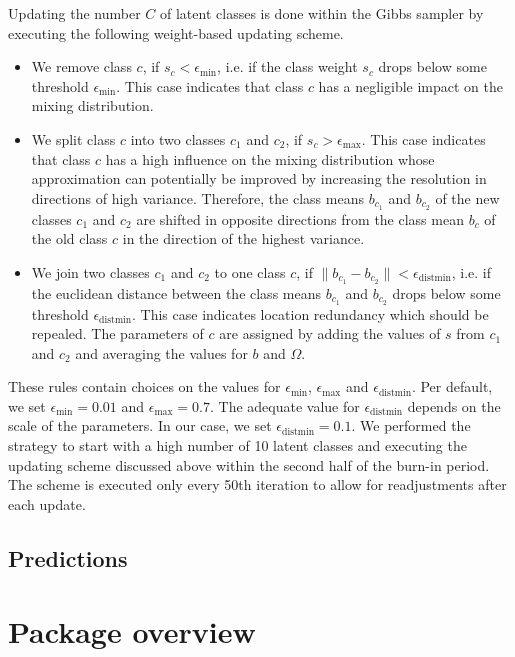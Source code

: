\documentclass[article]{jss}
\begin{document}
Updating the number $C$ of latent classes is done within the Gibbs sampler by executing the following weight-based updating scheme.
\begin{itemize}
	\item We remove class $c$, if $s_c<\epsilon_{\text{min}}$, i.e. if the class weight $s_c$ drops below some threshold $\epsilon_{\text{min}}$. This case indicates that class $c$ has a negligible impact on the mixing distribution.
	\item We split class $c$ into two classes $c_1$ and $c_2$, if $s_c>\epsilon_\text{max}$. This case indicates that class $c$ has a high influence on the mixing distribution whose approximation can potentially be improved by increasing the resolution in directions of high variance. Therefore, the class means $b_{c_1}$ and $b_{c_2}$ of the new classes $c_1$ and $c_2$ are shifted in opposite directions from the class mean $b_c$ of the old class $c$ in the direction of the highest variance.
	\item We join two classes $c_1$ and $c_2$ to one class $c$, if $\lVert b_{c_1} - b_{c_2} \rVert<\epsilon_{\text{distmin}}$, i.e. if the euclidean distance between the class means $b_{c_1}$ and $b_{c_2}$  drops below some threshold $\epsilon_{\text{distmin}}$. This case indicates location redundancy which should be repealed. The parameters of $c$ are assigned by adding the values of $s$ from $c_1$ and $c_2$ and averaging the values for $b$ and $\Omega$.
\end{itemize}
These rules contain choices on the values for $\epsilon_{\text{min}}$, $\epsilon_{\text{max}}$ and $\epsilon_{\text{distmin}}$. Per default, we set $\epsilon_{\text{min}}=0.01$ and $\epsilon_{\text{max}}=0.7$. The adequate value for $\epsilon_{\text{distmin}}$ depends on the scale of the parameters. In our case, we set $\epsilon_{\text{distmin}}=0.1$. We performed the strategy to start with a high number of 10 latent classes and executing the updating scheme discussed above within the second half of the burn-in period. The scheme is executed only every 50th iteration to allow for readjustments after each update.


\subsection{Predictions} \label{subsec:pred}


\section{Package overview} \label{sec:overview}
\end{document}
